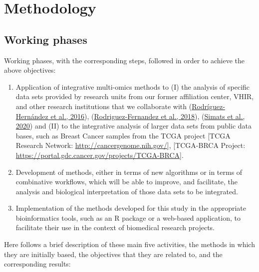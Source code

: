 \documentclass[a4paper, nobind]{templates/ociamthesis}
\renewcommand{\chaptermark}[1]{\markboth{\thechapter. #1}{\thechapter. #1}}
\begin{document}
\hypertarget{methods}{%
\chapter{Methodology}\label{methods}}

\chaptermark{Methodology}

\minitoc 

\hypertarget{work-phases}{%
\section{Working phases}\label{work-phases}}

Working phases, with the corresponding steps, followed in order to achieve the above objectives:

\begin{enumerate}
\def\labelenumi{\arabic{enumi}.}
\item
  Application of integrative multi-omics methods to (I) the analysis of specific data sets provided by research units from our former affiliation center, VHIR, and other research institutions that we collaborate with (\protect\hyperlink{ref-rodriguez-hernandez_cinacalcet_2016}{Rodríguez-Hernández et al., 2016}), (\protect\hyperlink{ref-rodriguez-fernandez_phosphatidylserine-liposomes_2018}{Rodriguez-Fernandez et al., 2018}), (\protect\hyperlink{ref-simats_mouse_2020}{Simats et al., 2020}) and (II) to the integrative analysis of larger data sets from public data bases, such as Breast Cancer samples from the TCGA project {[}TCGA Research Network: \url{http://cancergenome.nih.gov/}{]}, {[}TCGA-BRCA Project: \url{https://portal.gdc.cancer.gov/projects/TCGA-BRCA}{]}.
\item
  Development of methods, either in terms of new algorithms or in terms of combinative workflows, which will be able to improve, and facilitate, the analysis and biological interpretation of those data sets to be integrated.
\item
  Implementation of the methods developed for this study in the appropriate bioinformatics tools, such as an R package or a web-based application, to facilitate their use in the context of biomedical research projects.
\end{enumerate}

Here follows a brief description of these main five activities, the methods in which they are initially based, the objectives that they are related to, and the corresponding results:
\end{document}
